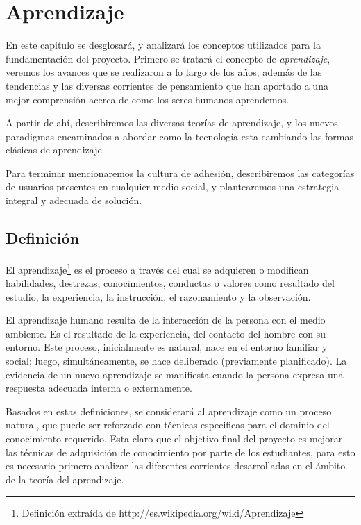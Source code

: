 \chapter{Aprendizaje}

En este capitulo se desglosará, y analizará los conceptos utilizados para la
fundamentación del proyecto. Primero se tratará el concepto de
\emph{aprendizaje}, veremos los avances que se realizaron a lo largo de los
años, además de las tendencias y las diversas corrientes de pensamiento que han
aportado a una mejor comprensión acerca de como los seres humanos aprendemos.

A partir de ahí, describiremos las diversas teorías de aprendizaje, y los nuevos
paradigmas encaminados a abordar como la tecnología esta cambiando las formas
clásicas de aprendizaje.

Para terminar mencionaremos la cultura de adhesión, describiremos las categorías
de usuarios presentes en cualquier medio social, y plantearemos una estrategia
integral y adecuada de solución.

\section{Definición}

El aprendizaje\footnote{Definición extraída de
http://es.wikipedia.org/wiki/Aprendizaje} es el proceso a través del cual se
adquieren o modifican habilidades, destrezas, conocimientos, conductas o valores
como resultado del estudio, la experiencia, la instrucción, el razonamiento y la
observación.

El aprendizaje humano resulta de la interacción de la persona con el medio
ambiente. Es el resultado de la experiencia, del contacto del hombre con su
entorno. Este proceso, inicialmente es natural, nace en el entorno familiar y
social; luego, simultáneamente, se hace deliberado (previamente planificado).
La evidencia de un nuevo aprendizaje se manifiesta cuando la persona expresa
una respuesta adecuada interna o externamente\cite{Rojas}.

Basados en estas definiciones, se considerará al aprendizaje como un proceso
natural, que puede ser reforzado con técnicas especificas para el dominio del 
conocimiento requerido. Esta claro que el objetivo final del proyecto es mejorar
las técnicas de adquisición de conocimiento por parte de los estudiantes, para
esto es necesario primero analizar las diferentes corrientes desarrolladas en el
ámbito de la teoría del aprendizaje.

